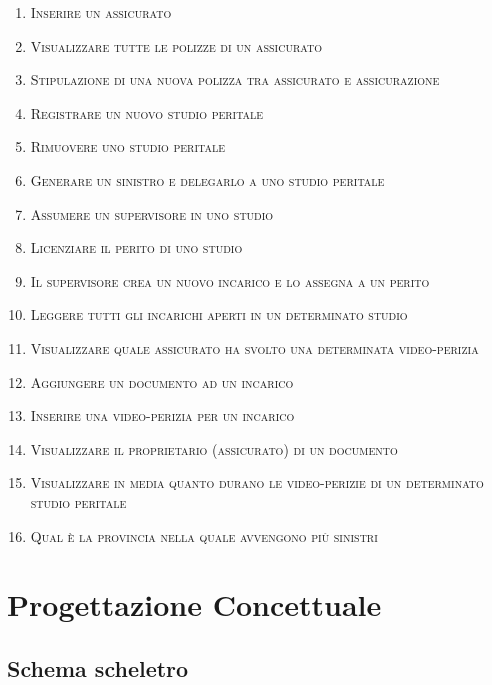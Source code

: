 \documentclass[a4paper,12pt]{report}
\begin{document}
\begin{enumerate}
    \item \textsc{Inserire un assicurato}
    \item \textsc{Visualizzare tutte le polizze di un assicurato}
    \item \textsc{Stipulazione di una nuova polizza tra assicurato e assicurazione}
    \item \textsc{Registrare un nuovo studio peritale}
    \item \textsc{Rimuovere uno studio peritale}
    \item \textsc{Generare un sinistro e delegarlo a uno studio peritale}
    \item \textsc{Assumere un supervisore in uno studio}
    \item \textsc{Licenziare il perito di uno studio}
    \item \textsc{Il supervisore crea un nuovo incarico e lo assegna a un perito}
    \item \textsc{Leggere tutti gli incarichi aperti in un determinato studio}
    \item \textsc{Visualizzare quale assicurato ha svolto una determinata video-perizia}
    \item \textsc{Aggiungere un documento ad un incarico}
    \item \textsc{Inserire una video-perizia per un incarico}
    \item \textsc{Visualizzare il proprietario (assicurato) di un documento}
    \item \textsc{Visualizzare in media quanto durano le video-perizie di un determinato studio peritale}
    \item \textsc{Qual è la provincia nella quale avvengono più sinistri}
\end{enumerate}


\chapter{Progettazione Concettuale}

\section{Schema scheletro}
\end{document}
